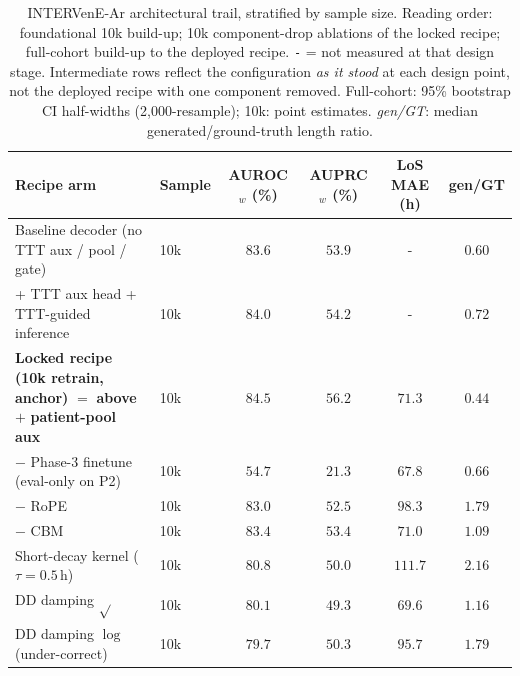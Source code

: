 \begin{table}[h]
\caption{INTERVenE-Ar architectural trail, stratified by sample size. Reading order: foundational 10k build-up; 10k component-drop ablations of the locked recipe; full-cohort build-up to the deployed recipe. \texttt{-} = not measured at that design stage. Intermediate rows reflect the configuration \emph{as it stood} at each design point, not the deployed recipe with one component removed. Full-cohort: 95\% bootstrap CI half-widths (2{,}000-resample); 10k: point estimates. \emph{gen/GT}: median generated/ground-truth length ratio.}
\label{tab:abl-ar-all}
\centering
\small
\setlength{\tabcolsep}{4pt}
\begin{tabular}{llcccc}
\toprule
Recipe arm & Sample & AUROC$_w$ (\%) & AUPRC$_w$ (\%) & LoS MAE (h) & gen/GT \\
\midrule
Baseline decoder (no TTT aux / pool / gate)      & 10k  & $83.6$                    & $53.9$                    & -                       & $0.60$ \\
\quad + TTT aux head + TTT-guided inference      & 10k  & $84.0$                    & $54.2$                    & -                       & $0.72$ \\
\midrule
\textbf{Locked recipe (10k retrain, anchor)} $=$ \textbf{above} $+$ \textbf{patient-pool aux}     & 10k  & $\mathbf{84.5}$           & $\mathbf{56.2}$           & $71.3$                  & $0.44$ \\
\quad $-$ Phase-3 finetune (eval-only on P2)     & 10k  & $54.7$                    & $21.3$                    & $67.8$                  & $0.66$ \\
\quad $-$ RoPE                                   & 10k  & $83.0$                    & $52.5$                    & $98.3$                  & $1.79$ \\
\quad $-$ CBM                                    & 10k  & $83.4$                    & $53.4$                    & $71.0$                  & $1.09$ \\
\quad Short-decay kernel ($\tau{=}0.5$\,h)          & 10k  & $80.8$                    & $50.0$                    & $111.7$                 & $2.16$ \\
\quad DD damping $\sqrt{}$                       & 10k  & $80.1$                    & $49.3$                    & $69.6$                  & $1.16$ \\
\quad DD damping $\log$ (under-correct)          & 10k  & $79.7$                    & $50.3$                    & $95.7$                  & $1.79$ \\

\end{tabular}
\end{table}
